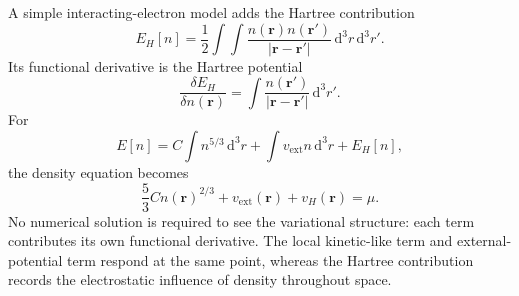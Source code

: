 \begin{example}
A simple interacting-electron model adds the Hartree contribution
\begin{equation}
E_H[n]=\frac12\int\!\int
\frac{n(\mathbf r)n(\mathbf r')}{|\mathbf r-\mathbf r'|}
\,\mathrm{d}^3r\,\mathrm{d}^3r'.
\end{equation}
Its functional derivative is the Hartree potential
\begin{equation}
\frac{\delta E_H}{\delta n(\mathbf r)}
=\int\frac{n(\mathbf r')}{|\mathbf r-\mathbf r'|}\,\mathrm{d}^3r'.
\end{equation}
For
\begin{equation}
E[n]=C\int n^{5/3}\,\mathrm{d}^3r
+\int v_{\mathrm{ext}}n\,\mathrm{d}^3r+E_H[n],
\end{equation}
the density equation becomes
\begin{equation}
\frac53 Cn(\mathbf r)^{2/3}+v_{\mathrm{ext}}(\mathbf r)
+v_H(\mathbf r)=\mu.
\end{equation}
No numerical solution is required to see the variational structure: each term contributes its own functional derivative. The local kinetic-like term and external-potential term respond at the same point, whereas the Hartree contribution records the electrostatic influence of density throughout space.
\end{example}
